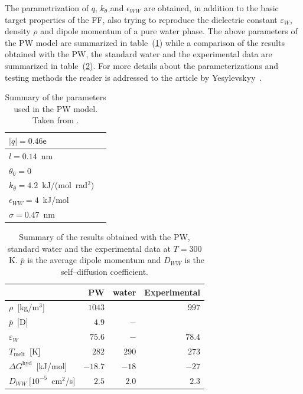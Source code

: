 The parametrization of $q$, $k_\theta$ and $\epsilon_{WW}$ are obtained, in addition to the basic target
properties of the \martini \ac{FF}, also trying to reproduce the dielectric constant $\varepsilon_{W}$, density
$\rho$ and dipole momentum of a pure water phase. The above parameters of the \ac{PW} model are summarized in
table~(\ref{tab:PWParam}) while a comparison of the results obtained with the \ac{PW}, the standard \martini
water and the experimental data are summarized in table~(\ref{tab:PWRes}). For more details about the
parameterizations and testing methods the reader is
addressed to the article by Yesylevskyy \etal\,\cite{PW}.
\begin{table}
	\centering
	\begin{tabular}{ll}
		\toprule
		$|q| = 0.46\mathsf{e}$				\\ \midrule
		$l = 0.14$~nm						\\ \midrule
		$\theta_0 = 0$						\\ \midrule
		$k_\theta = 4.2$~kJ/(mol\ rad$^2$)	\\ \midrule
		$\epsilon_{WW} = 4$~kJ/mol			\\ \midrule
		$\sigma = 0.47$~nm					\\ \bottomrule
	\end{tabular}
	\caption{Summary of the parameters used in the \acs{PW} model. Taken from \cite{PW}.}
	\label{tab:PWParam}
\end{table}

\begin{table}
	\centering
	\begin{tabular}{lrrr}
		\toprule
		\,	& \acs{PW} &  \martini water & Experimental \\ \toprule
		$\rho$~[kg/m$^3$]				& $1043$  &   		& $997$		\\ \midrule
		$\overline{p}$~[D] 				& $4.9$   & $-$ 	& 		    \\ \midrule
		$\varepsilon_{W}$ 				& $75.6$  & $-$ 	& $78.4$	\\ \midrule
		$T_\text{melt}$~[K] 			& $282$   & $290$ 	& $273$		\\ \midrule
		$\Delta G^\text{hyd}$~[kJ/mol] 	& $-18.7$ &	$-18$	& $-27$		\\ \midrule%
		$D_{WW}~[10^{-5}$~cm$^2$/s]		& $2.5$   & $2.0$   & $2.3$		\\ \bottomrule
	\end{tabular}
	\caption{Summary of the results obtained with the \acs{PW}, standard \martini water and the experimental data at $T=300$~K. $\overline{p}$ is the average dipole momentum and $D_{WW}$ is the self--diffusion coefficient.}
	\label{tab:PWRes}
\end{table}

